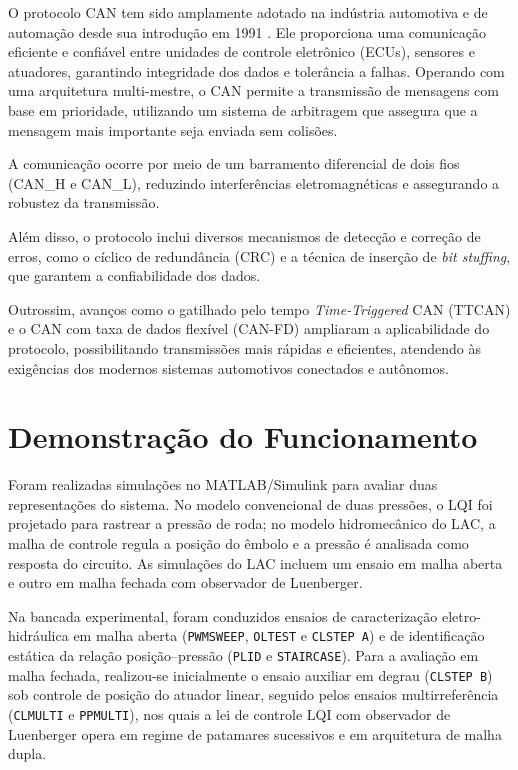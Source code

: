  O protocolo \gls{CAN} tem sido amplamente adotado na indústria automotiva e de automação desde sua introdução em 1991 \cite{wiley2022}. Ele proporciona uma comunicação eficiente e confiável entre unidades de controle eletrônico (ECUs), sensores e atuadores, garantindo integridade dos dados e tolerância a falhas. Operando com uma arquitetura multi-mestre, o CAN permite a transmissão de mensagens com base em prioridade, utilizando um sistema de arbitragem que assegura que a mensagem mais importante seja enviada sem colisões. 
 
 A comunicação ocorre por meio de um barramento diferencial de dois fios (CAN\_H e CAN\_L), reduzindo interferências eletromagnéticas e assegurando a robustez da transmissão.
 
 Além disso, o protocolo inclui diversos mecanismos de detecção e correção de erros, como o cíclico de redundância (CRC) e a técnica de inserção de \textit{bit stuffing}, que garantem a confiabilidade dos dados.
 
 Outrossim, avanços como o gatilhado pelo tempo \textit{Time-Triggered} CAN (TTCAN) e o CAN com taxa de dados flexível (CAN-FD) ampliaram a aplicabilidade do protocolo, possibilitando transmissões mais rápidas e eficientes, atendendo às exigências dos modernos sistemas automotivos conectados e autônomos.

\section{Demonstração do Funcionamento}
\label{sec:metodologia-7}
Foram realizadas simulações no MATLAB/Simulink para avaliar duas representações do sistema. No modelo convencional de duas pressões, o LQI foi projetado para rastrear a pressão de roda; no modelo hidromecânico do LAC, a malha de controle regula a posição do êmbolo e a pressão é analisada como resposta do circuito. As simulações do LAC incluem um ensaio em malha aberta e outro em malha fechada com observador de Luenberger.

Na bancada experimental, foram conduzidos ensaios de caracterização eletro-hidráulica em malha aberta (\texttt{PWMSWEEP}, \texttt{OLTEST} e \texttt{CLSTEP A}) e de identificação estática da relação posição--pressão (\texttt{PLID} e \texttt{STAIRCASE}). Para a avaliação em malha fechada, realizou-se inicialmente o ensaio auxiliar em degrau (\texttt{CLSTEP B}) sob controle de posição do atuador linear, seguido pelos ensaios multirreferência (\texttt{CLMULTI} e \texttt{PPMULTI}), nos quais a lei de controle LQI com observador de Luenberger opera em regime de patamares sucessivos e em arquitetura de malha dupla.



